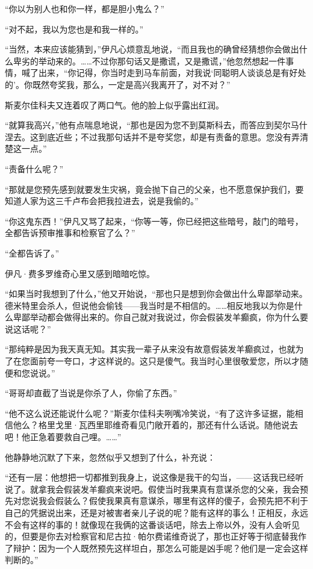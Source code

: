 \par “你以为别人也和你一样，都是胆小鬼么？”
\par “对不起，我以为您也是和我一样的。”
\par “当然，本来应该能猜到，”伊凡心烦意乱地说，“而且我也的确曾经猜想你会做出什么卑劣的举动来的。……不过你那句话又是撒谎，又是撒谎，”他忽然想起一件事情，喊了出来，“你记得，你当时走到马车前面，对我说‘同聪明人谈谈总是有好处的’。你既然夸奖我，那么，一定是高兴我离开了，对不对？”
\par 斯麦尔佳科夫又连着叹了两口气。他的脸上似乎露出红润。
\par “就算我高兴，”他有点喘息地说，“那也是因为您不到莫斯科去，而答应到契尔马什涅去。这到底近些；不过我那句话并不是夸奖您，却是有责备的意思。您没有弄清楚这一点。”
\par “责备什么呢？”
\par “那就是您预先感到就要发生灾祸，竟会抛下自己的父亲，也不愿意保护我们，要知道人家为这三千卢布会把我拉进去，说是我偷的。”
\par “你这鬼东西！”伊凡又骂了起来，“你等一等，你已经把这些暗号，敲门的暗号，全都告诉预审推事和检察官了么？”
\par “全都告诉了。”
\par 伊凡·费多罗维奇心里又感到暗暗吃惊。
\par “如果当时我想到了什么，”他又开始说，“那也只是想到你会做出什么卑鄙举动来。德米特里会杀人，但说他会偷钱——我当时是不相信的。……相反地我以为你是什么卑鄙举动都会做得出来的。你自己就对我说过，你会假装发羊癫疯，你为什么要说这话呢？”
\par “那纯粹是因为我天真无知。其实我一辈子从来没有故意假装发羊癫疯过，也就为了在您面前夸一夸口，才这样说的。这只是傻气。我当时心里很敬爱您，所以才随便和您说说。”
\par “哥哥却直截了当说是你杀了人，你偷了东西。”
\par “他不这么说还能说什么呢？”斯麦尔佳科夫咧嘴冷笑说，“有了这许多证据，能相信他么？格里戈里·瓦西里耶维奇看见门敞开着的，那还有什么话说。随他说去吧！他正急着要救自己哩。……”
\par 他静静地沉默了下来，忽然似乎又想到了什么，补充说：
\par “还有一层：他想把一切都推到我身上，说这像是我干的勾当，——这话我已经听说了。就拿我会假装发羊癫疯来说吧。假使当时我果真有意谋杀您的父亲，我会预先对您说我会假装么？假使我果真有意谋杀，哪里有这样的傻子，会预先把不利于自己的凭据说出来，还是对被害者亲儿子说的呢？能有这样的事么！正相反，永远不会有这样的事的！就像现在我俩的这番谈话吧，除去上帝以外，没有人会听见的，但要是你去对检察官和尼古拉·帕尔费诺维奇说了，那也正好等于彻底替我作了辩护：因为一个人既然预先这样坦白，那怎么可能是凶手呢？他们是一定会这样判断的。”
